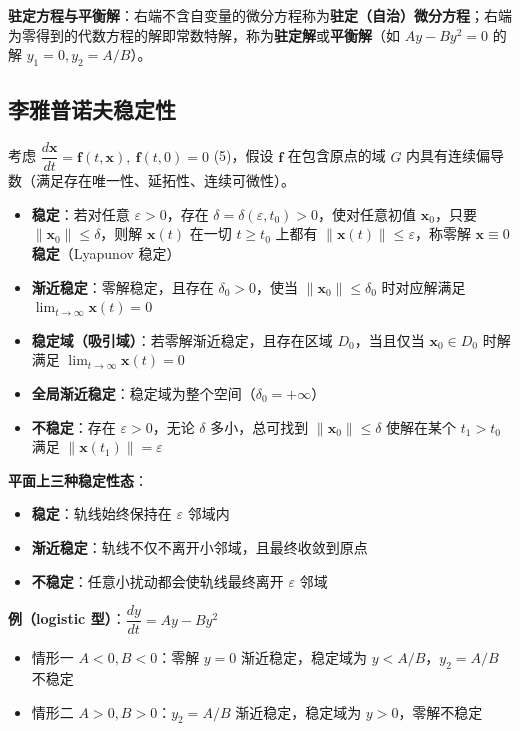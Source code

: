 \textbf{驻定方程与平衡解}：右端不含自变量的微分方程称为\textbf{驻定（自治）微分方程}；右端为零得到的代数方程的解即常数特解，称为\textbf{驻定解}或\textbf{平衡解}（如 $Ay - By^2 = 0$ 的解 $y_1 = 0, y_2 = A/B$）。

\subsection{李雅普诺夫稳定性}

考虑 $\dfrac{d\mathbf{x}}{dt} = \mathbf{f}(t, \mathbf{x}), \ \mathbf{f}(t, 0) = 0$ (5)，假设 $\mathbf{f}$ 在包含原点的域 $G$ 内具有连续偏导数（满足存在唯一性、延拓性、连续可微性）。

\begin{itemize}
    \item \textbf{稳定}：若对任意 $\varepsilon > 0$，存在 $\delta = \delta(\varepsilon, t_0) > 0$，使对任意初值 $\mathbf{x}_0$，只要 $\|\mathbf{x}_0\| \le \delta$，则解 $\mathbf{x}(t)$ 在一切 $t \ge t_0$ 上都有 $\|\mathbf{x}(t)\| \le \varepsilon$，称零解 $\mathbf{x} \equiv 0$ \textbf{稳定}（Lyapunov 稳定）
    \item \textbf{渐近稳定}：零解稳定，且存在 $\delta_0 > 0$，使当 $\|\mathbf{x}_0\| \le \delta_0$ 时对应解满足 $\lim_{t\to\infty}\mathbf{x}(t) = 0$
    \item \textbf{稳定域（吸引域）}：若零解渐近稳定，且存在区域 $D_0$，当且仅当 $\mathbf{x}_0 \in D_0$ 时解满足 $\lim_{t\to\infty}\mathbf{x}(t) = 0$
    \item \textbf{全局渐近稳定}：稳定域为整个空间（$\delta_0 = +\infty$）
    \item \textbf{不稳定}：存在 $\varepsilon > 0$，无论 $\delta$ 多小，总可找到 $\|\mathbf{x}_0\| \le \delta$ 使解在某个 $t_1 > t_0$ 满足 $\|\mathbf{x}(t_1)\| = \varepsilon$
\end{itemize}

\textbf{平面上三种稳定性态}：
\begin{itemize}
    \item[(a)] \textbf{稳定}：轨线始终保持在 $\varepsilon$ 邻域内
    \item[(b)] \textbf{渐近稳定}：轨线不仅不离开小邻域，且最终收敛到原点
    \item[(c)] \textbf{不稳定}：任意小扰动都会使轨线最终离开 $\varepsilon$ 邻域
\end{itemize}

\textbf{例（logistic 型）}：$\dfrac{dy}{dt} = Ay - By^2$
\begin{itemize}
    \item 情形一 $A < 0, B < 0$：零解 $y=0$ 渐近稳定，稳定域为 $y < A/B$，$y_2 = A/B$ 不稳定
    \item 情形二 $A > 0, B > 0$：$y_2 = A/B$ 渐近稳定，稳定域为 $y > 0$，零解不稳定
\end{itemize}

